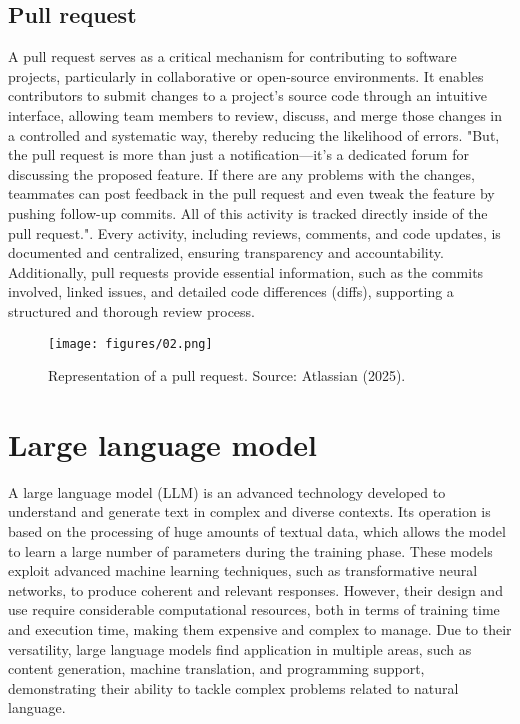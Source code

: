 \subsection{Pull request}
A pull request serves as a critical mechanism for contributing to software projects, particularly in collaborative or open-source environments. It enables contributors to submit changes to a project's source code through an intuitive interface, allowing team members to review, discuss, and merge those changes in a controlled and systematic way, thereby reducing the likelihood of errors. "But, the pull request is more than just a notification—it’s a dedicated forum for discussing the proposed feature. If there are any problems with the changes, teammates can post feedback in the pull request and even tweak the feature by pushing follow-up commits. All of this activity is tracked directly inside of the pull request."\citet{atlassian_pull_request}. Every activity, including reviews, comments, and code updates, is documented and centralized, ensuring transparency and accountability. Additionally, pull requests provide essential information, such as the commits involved, linked issues, and detailed code differences (diffs), supporting a structured and thorough review process.
\begin{figure}[H]
  \centering
  \texttt{[image: figures/02.png]}
  \caption{Representation of a pull request. Source: Atlassian (2025)\citet{atlassian_pull_request}.}
  \label{fig:pull_request_image}
\end{figure}

\section{Large language model}
A large language model (LLM) is an advanced technology developed to understand and generate text in complex and diverse contexts. Its operation is based on the processing of huge amounts of textual data, which allows the model to learn a large number of parameters during the training phase. These models exploit advanced machine learning techniques, such as transformative neural networks, to produce coherent and relevant responses. However, their design and use require considerable computational resources, both in terms of training time and execution time, making them expensive and complex to manage. Due to their versatility, large language models find application in multiple areas, such as content generation, machine translation, and programming support, demonstrating their ability to tackle complex problems related to natural language.
